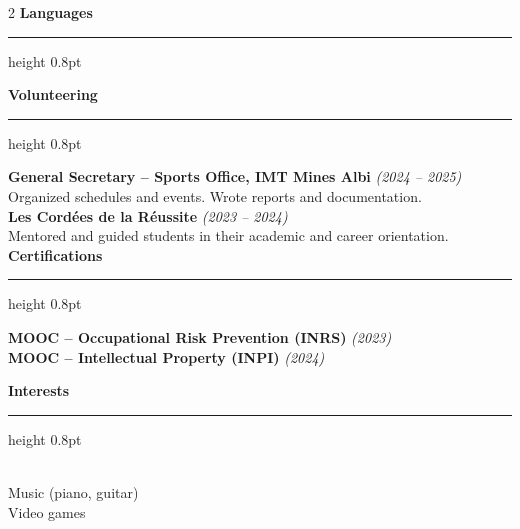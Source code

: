 \documentclass[10.5pt,a4paper]{article}
\newcommand{\subsectitle}[1]{%
  {\color{accent}\bfseries\large #1}\\[-2pt]
  {\color{accent}\hrule height 0.8pt}\vspace{4pt}
}
\newcommand{\sidebardated}[3]{%
  \textbf{\small #1} {\itshape\color{graytext}\footnotesize (#2)}\\
  {\small #3}\\[3pt]
}
\newcommand{\sidebarcert}[2]{%
  \noindent\textbf{\small #1} {\itshape\color{graytext}\footnotesize (#2)}\\[2pt]
}
\begin{document}
\begin{paracol}{2}
\subsectitle{Languages}

\vspace{5pt}

\subsectitle{Volunteering}

\sidebardated{General Secretary -- Sports Office, IMT Mines Albi}{2024 -- 2025}{Organized schedules and events. Wrote reports and documentation.}

\sidebardated{Les Cordées de la Réussite}{2023 -- 2024}{Mentored and guided students in their academic and career orientation.}

\subsectitle{Certifications}

\sidebarcert{MOOC -- Occupational Risk Prevention (INRS)}{2023}
\sidebarcert{MOOC -- Intellectual Property (INPI)}{2024}

\vspace{4pt}

\subsectitle{Interests}
\\
{\small Music (piano, guitar)}\\
{\small Video games}

\end{paracol}
\end{document}
